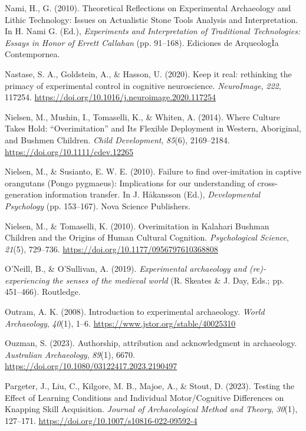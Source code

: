 \documentclass[
  11pt,
  letterpaper,
  DIV=11,
  numbers=noendperiod]{scrartcl}
\newlength{\cslhangindent}
\newenvironment{CSLReferences}[2] %
 {\begin{list}{}{%
  \setlength{\itemindent}{0pt}
  \setlength{\leftmargin}{0pt}
  \setlength{\parsep}{0pt}
  \ifodd #1
   \setlength{\leftmargin}{\cslhangindent}
   \setlength{\itemindent}{-1\cslhangindent}
  \fi
  \setlength{\itemsep}{#2\baselineskip}}}
 {\end{list}}
\begin{document}
\begin{CSLReferences}{1}{0}
Nami, H., G. (2010). Theoretical {Reflections} on {Experimental}
{Archaeology} and {Lithic} {Technology}: {Issues} on {Actualistic}
{Stone} {Tools} {Analysis} and {Interpretation}. In H. Nami G. (Ed.),
\emph{Experiments and {Interpretation} of {Traditional} {Technologies}:
{Essays} in {Honor} of {Errett} {Callahan}} (pp. 91--168). Ediciones de
ArqueologÌa Contempornea.

Nastase, S. A., Goldstein, A., \& Hasson, U. (2020). Keep it real:
rethinking the primacy of experimental control in cognitive
neuroscience. \emph{NeuroImage}, \emph{222}, 117254.
\url{https://doi.org/10.1016/j.neuroimage.2020.117254}

Nielsen, M., Mushin, I., Tomaselli, K., \& Whiten, A. (2014). Where
Culture Takes Hold: {``}Overimitation{''} and Its Flexible Deployment in
Western, Aboriginal, and Bushmen Children. \emph{Child Development},
\emph{85}(6), 2169--2184. \url{https://doi.org/10.1111/cdev.12265}

Nielsen, M., \& Susianto, E. W. E. (2010). Failure to find
over-imitation in captive orangutans ({Pongo} pygmaeus): {Implications}
for our understanding of cross-generation information transfer. In J.
Håkansson (Ed.), \emph{Developmental {Psychology}} (pp. 153--167). Nova
Science Publishers.

Nielsen, M., \& Tomaselli, K. (2010). Overimitation in Kalahari Bushman
Children and the Origins of Human Cultural Cognition.
\emph{Psychological Science}, \emph{21}(5), 729--736.
\url{https://doi.org/10.1177/0956797610368808}

O'Neill, B., \& O'Sullivan, A. (2019). \emph{Experimental archaeology
and (re)-experiencing the senses of the medieval world} (R. Skeates \&
J. Day, Eds.; pp. 451--466). Routledge.

Outram, A. K. (2008). Introduction to experimental archaeology.
\emph{World Archaeology}, \emph{40}(1), 1--6.
\url{https://www.jstor.org/stable/40025310}

Ouzman, S. (2023). Authorship, attribution and acknowledgment in
archaeology. \emph{Australian Archaeology}, \emph{89}(1), 6670.
\url{https://doi.org/10.1080/03122417.2023.2190497}

Pargeter, J., Liu, C., Kilgore, M. B., Majoe, A., \& Stout, D. (2023).
Testing the Effect of Learning Conditions and Individual Motor/Cognitive
Differences on Knapping Skill Acquisition. \emph{Journal of
Archaeological Method and Theory}, \emph{30}(1), 127--171.
\url{https://doi.org/10.1007/s10816-022-09592-4}


\end{CSLReferences}
\end{document}
